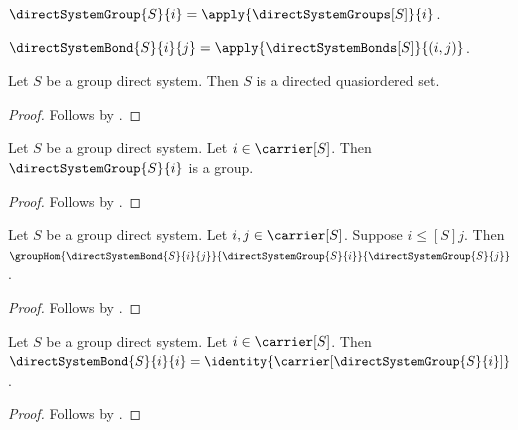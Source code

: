 \begin{definition}\label{direct_system_group}
    $\directSystemGroup{S}{i}=
        \apply{\directSystemGroups[S]}{i}$.
\end{definition}

\begin{definition}\label{direct_system_bond}
    $\directSystemBond{S}{i}{j}=
        \apply{\directSystemBonds[S]}{(i,j)}$.
\end{definition}

\begin{proposition}\label{group_direct_system_is_directed}
    Let $S$ be a group direct system.
    Then $S$ is a directed quasiordered set.
\end{proposition}
\begin{proof}
    Follows by .
\end{proof}

\begin{proposition}\label{direct_system_group_is_group}
    Let $S$ be a group direct system.
    Let $i\in\carrier[S]$.
    Then $\directSystemGroup{S}{i}$ is a group.
\end{proposition}
\begin{proof}
    Follows by
        .
\end{proof}

\begin{proposition}\label{direct_system_bond_hom}
    Let $S$ be a group direct system.
    Let $i,j\in\carrier[S]$.
    Suppose $i\mathrel{\leq[S]}j$.
    Then $\groupHom
        {\directSystemBond{S}{i}{j}}
        {\directSystemGroup{S}{i}}
        {\directSystemGroup{S}{j}}$.
\end{proposition}
\begin{proof}
    Follows by
        .
\end{proof}

\begin{proposition}\label{direct_system_bond_identity}
    Let $S$ be a group direct system.
    Let $i\in\carrier[S]$.
    Then $\directSystemBond{S}{i}{i}
        =\identity{\carrier[\directSystemGroup{S}{i}]}$.
\end{proposition}
\begin{proof}
    Follows by
        .
\end{proof}

